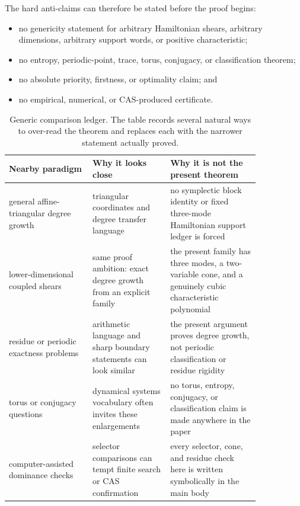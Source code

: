 \documentclass[11pt]{article}
\theoremstyle{remark}
\numberwithin{equation}{section}
\begin{document}
The hard anti-claims can therefore be stated before the proof begins:
\begin{itemize}
\item no genericity statement for arbitrary Hamiltonian shears, arbitrary
  dimensions, arbitrary support words, or positive characteristic;
\item no entropy, periodic-point, trace, torus, conjugacy, or classification
  theorem;
\item no absolute priority, firstness, or optimality claim; and
\item no empirical, numerical, or CAS-produced certificate.
\end{itemize}

\begin{table}[t]
\centering
\small
\begin{tabular}{p{0.28\linewidth}p{0.26\linewidth}p{0.30\linewidth}}
\toprule
Nearby paradigm & Why it looks close & Why it is not the present theorem \\
\midrule
general affine-triangular degree growth & triangular coordinates and degree transfer language & no symplectic block identity or fixed three-mode Hamiltonian support ledger is forced \\
lower-dimensional coupled shears & same proof ambition: exact degree growth from an explicit family & the present family has three modes, a two-variable cone, and a genuinely cubic characteristic polynomial \\
residue or periodic exactness problems & arithmetic language and sharp boundary statements can look similar & the present argument proves degree growth, not periodic classification or residue rigidity \\
torus or conjugacy questions & dynamical systems vocabulary often invites these enlargements & no torus, entropy, conjugacy, or classification claim is made anywhere in the paper \\
computer-assisted dominance checks & selector comparisons can tempt finite search or CAS confirmation & every selector, cone, and residue check here is written symbolically in the main body \\
\bottomrule
\end{tabular}
\caption{Generic comparison ledger.  The table records several natural ways to over-read the theorem and replaces each with the narrower statement actually proved.}
\label{tab:genericcompare}
\end{table}
\end{document}
